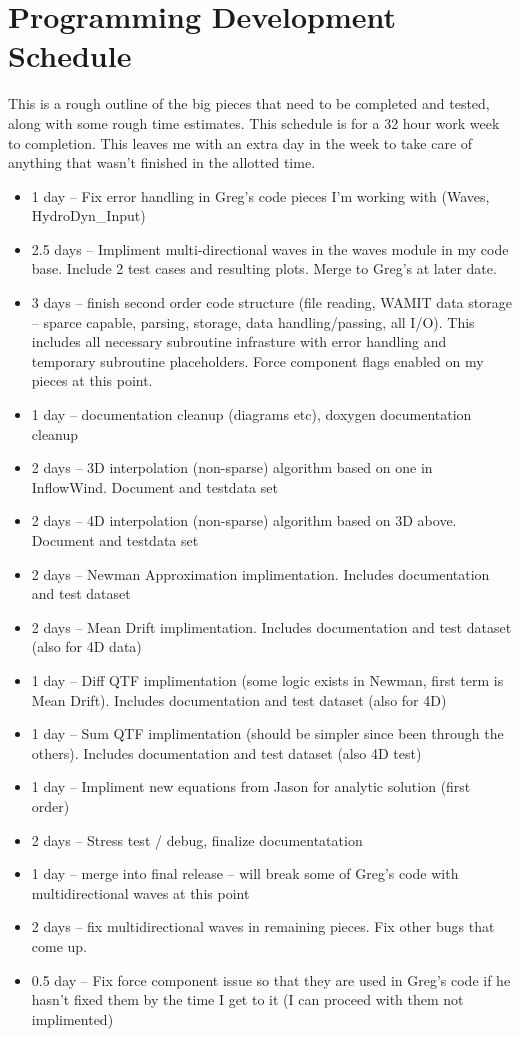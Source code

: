 \chapter{Programming Development Schedule}
\label{chap:DevSched}

This is a rough outline of the big pieces that need to be completed and tested, along with some rough time estimates.  This schedule is for a 32 hour work week to completion.  This leaves me with an extra day in the week to take care of anything that wasn't finished in the allotted time.

\begin{itemize}
   \item{1 day -- Fix error handling in Greg's code pieces I'm working with (Waves, HydroDyn\_Input)}
   \item{2.5 days -- Impliment multi-directional waves in the waves module in my code base.  Include 2 test cases and resulting plots.  Merge to Greg's at later date.}
   \item{3 days -- finish second order code structure (file reading, WAMIT data storage -- sparce capable, parsing, storage, data handling/passing, all I/O).  This includes all necessary subroutine infrasture with error handling and temporary subroutine placeholders.  Force component flags enabled on my pieces at this point.}
   \item{1 day -- documentation cleanup (diagrams etc), doxygen documentation cleanup}
   \item{2 days -- 3D interpolation (non-sparse) algorithm based on one in InflowWind.  Document and testdata set}
   \item{2 days -- 4D interpolation (non-sparse) algorithm based on 3D above.  Document and testdata set}
   \item{2 days -- Newman Approximation implimentation.  Includes documentation and test dataset}
   \item{2 days -- Mean Drift implimentation.  Includes documentation and test dataset (also for 4D data)}
   \item{1 day -- Diff QTF implimentation (some logic exists in Newman, first term is Mean Drift).  Includes documentation and test dataset (also for 4D)}
   \item{1 day -- Sum QTF implimentation (should be simpler since been through the others).  Includes documentation and test dataset (also 4D test)}
   \item{1 day -- Impliment new equations from Jason for analytic solution (first order)}
   \item{2 days -- Stress test / debug, finalize documentatation}
   \item{1 day -- merge into final release -- will break some of Greg's code with multidirectional waves at this point}
   \item{2 days -- fix multidirectional waves in remaining pieces.  Fix other bugs that come up.}
   \item{0.5 day -- Fix force component issue so that they are used in Greg's code if he hasn't fixed them by the time I get to it (I can proceed with them not implimented)}
\end{itemize}



